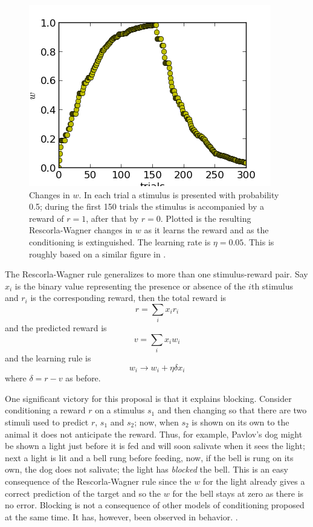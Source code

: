 \documentclass[11pt,a4paper]{scrartcl}
\begin{document}
\begin{figure}
\begin{center}
\includegraphics{RW.png}%
\end{center}
\caption{Changes in $w$. In each trial a stimulus is presented with probability 0.5; during the first 150 trials the stimulus is accompanied by a reward of $r=1$, after that by $r=0$. Plotted is the resulting Rescorla-Wagner changes in $w$ as it learns the reward and as the conditioning is extinguished. The learning rate is $\eta=0.05$. This is roughly based on a similar figure in \cite{DayanAbbott2001a}. \label{fig:w}}
\end{figure}

The Rescorla-Wagner rule generalizes to more than one stimulus-reward pair. Say $x_i$ is the binary value representing the presence or absence of the $i$th stimulus and $r_i$ is the corresponding reward, then the total reward is
\begin{equation}
r=\sum_i x_ir_i
\end{equation}
and the predicted reward is
\begin{equation}
v=\sum_i x_iw_i
\end{equation}
and the learning rule is
\begin{equation}
w_i\rightarrow w_i+\eta\delta x_i
\end{equation}
where $\delta=r-v$ as before. 

One significant victory for this proposal is that it explains
blocking. Consider conditioning a reward $r$ on a stimulus $s_1$ and
then changing so that there are two stimuli used to predict $r$, $s_1$
and $s_2$; now, when $s_2$ is shown on its own to the animal it does
not anticipate the reward. Thus, for example, Pavlov's dog might be
shown a light just before it is fed and will soon salivate when it
sees the light; next a light is lit and a bell rung before feeding,
now, if the bell is rung on its own, the dog does not salivate; the
light has \textsl{blocked} the bell. This is an easy consequence of
the Rescorla-Wagner rule since the $w$ for the light already gives a
correct prediction of the target and so the $w$ for the bell stays at
zero as there is no error. Blocking is not a consequence of other
models of conditioning proposed at the same time. It has, however,
been observed in behavior.
\cite{MillerEtAl1995a,AzorlosaCicala1986a}.
\end{document}
